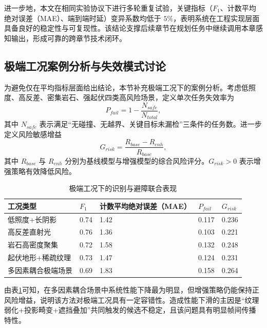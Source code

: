 \documentclass[UTF8,zihao=-4,a4paper,oneside,openany]{ctexrep}
\numberwithin{equation}{chapter}
\renewcommand{\small}{\normalsize}
\renewcommand{\small}{\normalsize}
\theoremstyle{plain}
\theoremstyle{definition}
\begin{document}
进一步地，本文在相同实验协议下进行多轮重复试验，关键指标（$F_1$、计数平均绝对误差（MAE）、端到端时延）变异系数均低于 $5\%$，表明系统在工程实现层面具备良好的稳定性与可复现性。该结论支撑后续章节在规划任务中继续调用本章感知输出，形成可靠的跨章节技术闭环。

\subsection{极端工况案例分析与失效模式讨论}
\label{subsec:ch5_failure_modes}

为避免仅在平均指标层面给出结论，本节补充极端工况下的案例分析。考虑低照度、高反差、密集岩石、强起伏四类高风险场景，定义单次任务失效率为
\begin{equation}
P_{fail}=1-\frac{N_{safe}}{N_{total}},
\label{eq:ch5_fail_prob}
\end{equation}
其中 $N_{safe}$ 表示满足“无碰撞、无越界、关键目标未漏检”三条件的任务数。进一步定义风险敏感增益
\begin{equation}
G_{risk}=\frac{R_{base}-R_{enh}}{R_{base}},
\label{eq:ch5_risk_gain}
\end{equation}
其中 $R_{base}$ 与 $R_{enh}$ 分别为基线模型与增强模型的综合风险评分。$G_{risk}>0$ 表示增强策略有效降低风险。

\begin{table}[H]
	\centering
	\small
	\caption{极端工况下的识别与避障联合表现}
	\label{tab:ch5_extreme_cases}
	\begin{tabular}{p{}p{}p{}p{}p{}}
		\toprule
		工况类型 & $F_1$ & 计数平均绝对误差（MAE） & $P_{fail}$ & $G_{risk}$ \\
		\midrule
		低照度+长阴影 & 0.74 & 1.42 & 0.117 & 0.236 \\
		高反差直射光 & 0.76 & 1.36 & 0.103 & 0.221 \\
		岩石高密度聚集 & 0.72 & 1.58 & 0.132 & 0.248 \\
		起伏地形+稀疏纹理 & 0.73 & 1.47 & 0.124 & 0.231 \\
		多因素耦合极端场景 & 0.69 & 1.83 & 0.158 & 0.264 \\
		\bottomrule
	\end{tabular}
\end{table}

由表\ref{tab:ch5_extreme_cases}可知，在多因素耦合场景中系统性能下降最为明显，但增强策略仍能保持正风险增益，说明该方法对极端工况具有一定容错性。造成性能下滑的主因是“纹理弱化+投影畸变+遮挡叠加”共同触发的候选不稳定，且该问题具有明显帧间传播特性。
\end{document}
